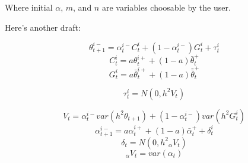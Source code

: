 Where initial $\alpha$, $m$, and $n$ are variables choosable by the user.


Here's another draft:

\begin{equation}\label{eq:dekf_thetanew}
\theta_{t+1}^{i-} = \alpha_{t}^{i-}C_{t}^{i} + (1-\alpha_{t}^{i-})G_{t}^{i} + \tau_{t}^{i}
\end{equation}
\begin{equation}
C_{t}^{i} = a\theta_{t}^{i+} + (1-a)\bar{\theta}_{t}^{+}
\end{equation}
\begin{equation}
G_{t}^{i} = a \bar{\theta}_{t}^{i+} + (1-a)\bar{\bar{\theta}}_{t}^{+}
\end{equation}

\begin{equation}\label{eq:dekf_tau_2}
\tau_{t}^{i} = N(0, h^{2}V_{t})
\end{equation}

\begin{equation}\label{eq:dekf_V_2}
V_{t} = \alpha_{t}^{i-} var(h^{2}\theta_{t+1}) + (1-\alpha_{t}^{i-}) var(h^{2}G_{t}^{i})
\end{equation}
\begin{equation}\label{eq:dekf_V_3}
\alpha_{t+1}^{i-} = a\alpha_{t}^{i+} + (1-a)\bar{\alpha}_{t}^{+} + \delta_{t}^{i}
\end{equation}
\begin{equation}\label{eq:dekf_V_4}
\delta_{t} = N(0, h^{2}{}_{\alpha}V_{t})
\end{equation}
\begin{equation}\label{eq:dekf_V_5}
{}_{\alpha}V_{t} = var(\alpha_{t})
\end{equation}